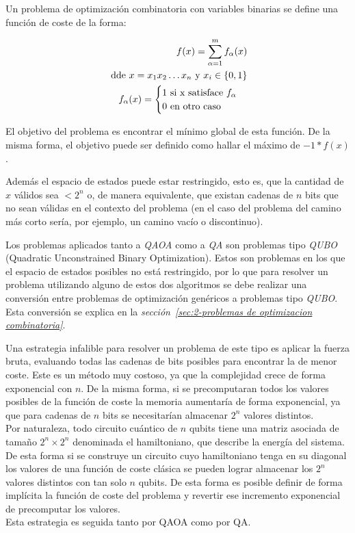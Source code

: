 Un problema de optimización combinatoria con variables binarias se define una función de coste de la forma:

\begin{align*}
  f(x) = \sum_{\alpha = 1}^{m} f_\alpha(x) \\
  \textnormal{ dde } x = x_1x_2 \ldots x_n \textnormal{ y } x_i\in{\{0, 1\}} \\
   f_{\alpha}(x) = \begin{cases}
     1 \textnormal{ si x satisface } f_\alpha \\
     0 \textnormal{ en otro caso}
   \end{cases}
\end{align*}


El objetivo del problema es encontrar el mínimo global de esta función. De la misma forma, el objetivo puede ser definido como hallar el máximo de $-1*f(x)$.

Además el espacio de estados puede estar restringido, esto es, que la cantidad de $x$ válidos sea $< 2^n$ o, de manera equivalente, que existan cadenas de $n$ bits que no sean válidas en el contexto del problema (en el caso del problema del camino más corto sería, por ejemplo, un camino vacío o discontinuo).

Los problemas aplicados tanto a \textit{QAOA} como a \textit{QA} son problemas tipo \textit{QUBO} (Quadratic Unconstrained Binary Optimization).
Estos son problemas en los que el espacio de estados posibles no está restringido, por lo que para resolver un problema utilizando alguno de estos dos algoritmos se debe realizar una conversión entre problemas de optimización genéricos a problemas tipo \textit{QUBO}. Esta conversión se explica en la \textit{sección~\ref{sec:2-problemas de optimizacion combinatoria}}.

Una estrategia infalible para resolver un problema de este tipo es aplicar la fuerza bruta, evaluando todas las cadenas de bits posibles para encontrar la de menor coste.
Este es un método muy costoso, ya que la complejidad crece de forma exponencial con $n$.
De la misma forma, si se precomputaran todos los valores posibles de la función de coste la memoria aumentaría de forma exponencial, ya que para cadenas de $n$ bits se necesitarían almacenar $2^n$ valores distintos.
\\
Por naturaleza, todo circuito cuántico de $n$ qubits tiene una matriz asociada de tamaño $2^n \times 2^n$ denominada el hamiltoniano, que describe la energía del sistema.
De esta forma si se construye un circuito cuyo hamiltoniano tenga en su diagonal los valores de una función de coste clásica se pueden lograr almacenar los $2^n$ valores distintos con tan solo $n$ qubits.
De esta forma es posible definir de forma implícita la función de coste del problema y revertir ese incremento exponencial de precomputar los valores.
\\
Esta estrategia es seguida tanto por QAOA como por QA\@.


